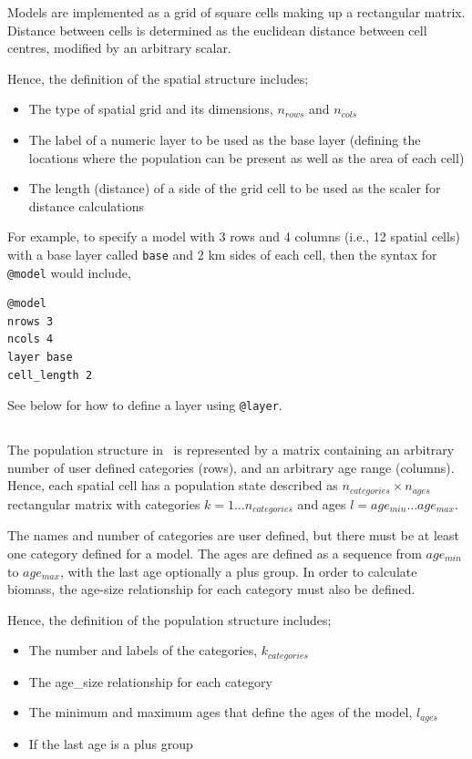 Models are implemented as a grid of square cells making up a rectangular matrix. Distance between cells is determined as the euclidean distance between cell centres, modified by an arbitrary scalar. 

Hence, the definition of the spatial structure includes;
\begin{itemize}
\item The type of spatial grid and its dimensions, $n_{rows}$ and $n_{cols}$
\item The label of a numeric layer to be used as the base layer (defining the locations where the population can be present as well as the area of each cell)
\item The length (distance) of a side of the grid cell to be used as the scaler for distance calculations
\end{itemize}

For example, to specify a model with 3 rows and 4 columns (i.e., 12 spatial cells) with a base layer called \texttt{base} and 2 km sides of each cell, then the syntax for \texttt{@model} would include,
{\small{\begin{verbatim}
@model
nrows 3
ncols 4
layer base
cell_length 2
\end{verbatim}}}

See below for how to define a layer using \texttt{@layer}. 

\subsection{}

The population structure in \SPM\ is represented by a matrix containing an arbitrary number of user defined categories (rows), and an arbitrary age range (columns). Hence, each spatial cell has a population state described as $n_{categories} \times n_{ages}$ rectangular matrix with categories $k=1 \ldots n_{categories}$ and ages $l=age_{min} \ldots age_{max}$. 

The names and number of categories are user defined, but there must be at least one category defined for a model. The ages are defined as a sequence from $age_{min}$ to $age_{max}$, with the last age optionally a plus group. In order to calculate biomass, the age-size relationship for each category must also be defined.

Hence, the definition of the population structure includes;
\begin{itemize}
  \item The number and labels of the categories, $k_{categories}$
	\item The age\_size relationship for each category
  \item The minimum and maximum ages that define the ages of the model, $l_{ages}$
  \item If the last age is a plus group
\end{itemize}

